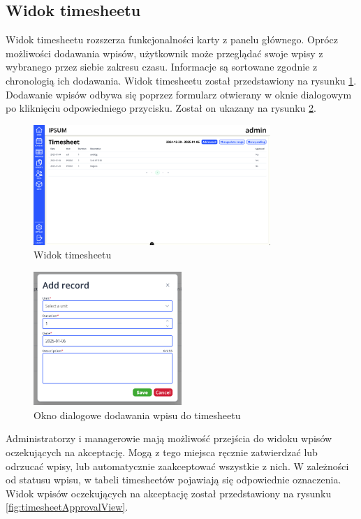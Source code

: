 \subsection{Widok timesheetu}

Widok timesheetu rozszerza funkcjonalności karty z panelu głównego. Oprócz możliwości dodawania wpisów, użytkownik może przeglądać swoje wpisy z wybranego przez siebie zakresu czasu. Informacje są sortowane zgodnie z chronologią ich dodawania. Widok timesheetu został przedstawiony na rysunku \ref{fig:timesheetView}. Dodawanie wpisów odbywa się poprzez formularz otwierany w oknie dialogowym po kliknięciu odpowiedniego przycisku. Został on ukazany na rysunku \ref{fig:timesheetDialog}.

\begin{figure}[H]
    \centering
    \includegraphics[width=0.8\textwidth, frame]{graf/front/timesheet.png}
    \caption{Widok timesheetu}
    \label{fig:timesheetView}
\end{figure}

\begin{figure}[H]
    \centering
    \includegraphics[width=0.5\textwidth]{graf/front/timesheetAddRecord.png}
    \caption{Okno dialogowe dodawania wpisu do timesheetu}
    \label{fig:timesheetDialog}
\end{figure}

Administratorzy i managerowie mają możliwość przejścia do widoku wpisów oczekujących na akceptację. Mogą z tego miejsca ręcznie zatwierdzać lub odrzucać wpisy, lub automatycznie zaakceptować wszystkie z nich. W zależności od statusu wpisu, w tabeli timesheetów pojawiają się odpowiednie oznaczenia. Widok wpisów oczekujących na akceptację został przedstawiony na rysunku \ref{fig:timesheetApprovalView}.

